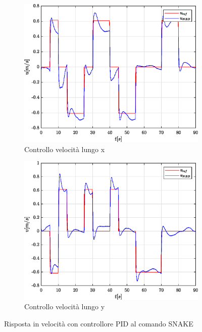 \begin{figure}
	\centering
	\begin{subfigure}{0.45\textwidth}
		\centering
		\includegraphics[width=1\textwidth]{Simulazioni/Figure/PID/SNAKE/PositionControlXVel}
		\caption{Controllo velocità lungo x}
		\label{fig:SNAKEerrvelxPID}
	\end{subfigure}
	\hfill
	\begin{subfigure}{0.45\textwidth}
		\centering
		\includegraphics[width=1\textwidth]{Simulazioni/Figure/PID/SNAKE/PositionControlYVel}
		\caption{Controllo velocità lungo y}
		\label{fig:SNAKEerrvelyPID}
	\end{subfigure}
	\caption{Risposta in velocità con controllore PID al comando SNAKE}
\end{figure}

